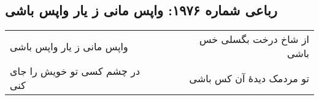 \begin{center}
\section*{رباعی شماره ۱۹۷۶: واپس مانی ز یار واپس باشی}
\label{sec:1976}
\begin{longtable}{l p{0.5cm} r}
واپس مانی ز یار واپس باشی
&&
از شاخ درخت بگسلی خس باشی
\\
در چشم کسی تو خویش را جای کنی
&&
تو مردمک دیدهٔ آن کس باشی
\\
\end{longtable}
\end{center}

